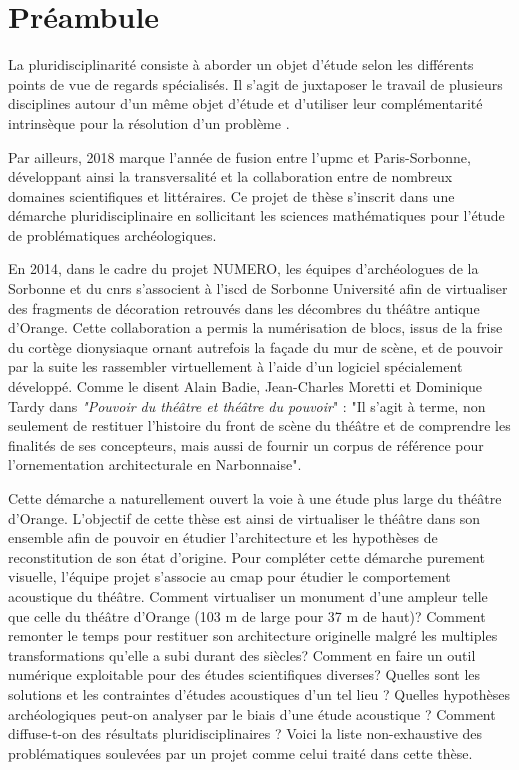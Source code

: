 \chapter*{Préambule}
	
	
			
La pluridisciplinarité consiste à aborder un objet d'étude selon les différents points de vue de regards spécialisés. Il s'agit de juxtaposer le travail de plusieurs disciplines autour d'un même objet d'étude et d'utiliser leur complémentarité intrinsèque pour la résolution d'un problème \cite[Pluridisciplinarite]{pluridisciplinarite}. 

Par ailleurs, 2018 marque l'année de fusion entre l'\gls{upmc} et Paris-Sorbonne, développant ainsi la transversalité et la collaboration entre de nombreux domaines scientifiques et littéraires. Ce projet de thèse s'inscrit dans une démarche pluridisciplinaire en sollicitant les sciences mathématiques pour l'étude de problématiques archéologiques.
						
En 2014, dans le cadre du projet NUMERO, les équipes d'archéologues de la Sorbonne et du \gls{cnrs} s'associent à l'\gls{iscd} de Sorbonne Université afin de virtualiser des fragments de décoration retrouvés dans les décombres du théâtre antique d'Orange. Cette collaboration a permis la numérisation de blocs, issus de la frise du cortège dionysiaque ornant autrefois la façade du mur de scène, et de pouvoir par la suite les rassembler virtuellement à l'aide d'un logiciel spécialement développé. Comme le disent Alain Badie, Jean-Charles Moretti et Dominique Tardy dans \textit{"Pouvoir du théâtre et théâtre du pouvoir}"\cite[p.32]{PouvoirDuTheatre} : "Il s'agit à terme, non seulement de restituer l'histoire du front de scène du théâtre et de comprendre les finalités de ses concepteurs, mais aussi de fournir un corpus de référence pour l'ornementation architecturale en Narbonnaise".
			
Cette démarche a naturellement ouvert la voie à une étude plus large du théâtre d'Or\-ange. L'objectif de cette thèse est ainsi de virtualiser le théâtre dans son ensemble afin de pouvoir en étudier l'architecture et les hypothèses de reconstitution de son état d'origine. Pour compléter cette démarche purement visuelle, l'équipe projet s'associe au \gls{cmap} pour étudier le comportement acoustique du théâtre. Comment virtualiser un monument d'une ampleur telle que celle du théâtre d'Orange (103 m de large pour 37 m de haut)? Comment remonter le temps pour restituer son architecture originelle malgré les multiples transformations qu'elle a subi durant des siècles? Comment en faire un outil numérique exploitable pour des études scientifiques diverses? Quelles sont les solutions et les contraintes d'études acoustiques d'un tel lieu ? Quelles hypothèses archéologiques peut-on analyser par le biais d'une étude acoustique ? Comment diffuse-t-on des résultats pluridisciplinaires ? Voici la liste non-exhaustive des problématiques soulevées par un projet comme celui traité dans cette thèse. 
			
